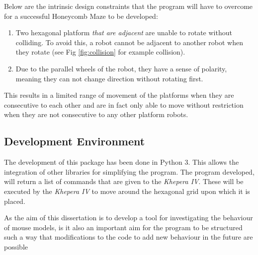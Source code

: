 Below are the intrinsic design constraints that the program will have to overcome for a successful Honeycomb Maze to be developed:
\begin{tcolorbox}
\begin{enumerate}
\item Two hexagonal platform \textit{that are adjacent} are unable to rotate without colliding. To avoid this, a robot cannot be adjacent to another robot when they rotate (see Fig \ref{fig:collision} for example collision).
\item Due to the parallel wheels of the robot, they have a sense of polarity, meaning they can not change direction without rotating first.
\end{enumerate}
\end{tcolorbox}
This results in a limited range of movement of the platforms when they are consecutive to each other and are in fact only able to move without restriction when they are not consecutive to any other platform robots.

\subsection{Development Environment}

The development of this package has been done in Python 3. This allows the integration of other libraries for simplifying the program.
The program developed, will return a list of commands that are given to the \textit{Khepera IV}. These will be executed by the  \textit{Khepera IV} to move around the hexagonal grid upon which it is placed.




As the aim of this dissertation is to develop a tool for investigating the behaviour of mouse models, is it also an important aim for the program to be structured such a way that modifications to the code to add new behaviour in the future are possible


